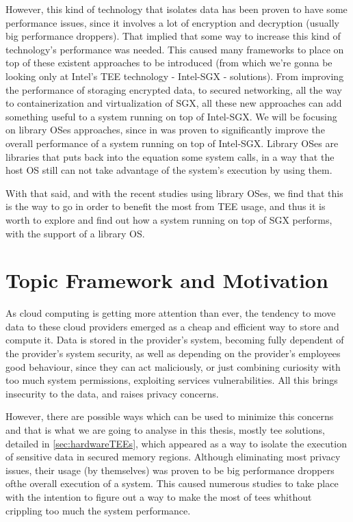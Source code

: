 However, this kind of technology that isolates data has been proven to have some performance issues, since it involves a lot of encryption and decryption (usually big performance droppers). That implied that some way to increase this kind of technology’s performance was needed. This caused many frameworks to place on top of these existent approaches to be introduced (from which we’re gonna be looking only at Intel’s TEE technology - Intel-SGX - solutions). 
From improving the performance of storaging encrypted data, to secured networking, all the way to containerization and virtualization of SGX, all these new approaches can add something useful to a system running on top of Intel-SGX. We will be focusing on library OSes approaches, since in \cite{graphenePaper} was proven to significantly improve the overall performance of a system running on top of Intel-SGX. Library OSes are libraries that puts back into the equation some system calls, in a way that the host OS still can not take advantage of the system’s execution by using them.
 
With that said, and with the recent studies using library OSes, we find that this is the way to go in order to benefit the most from TEE usage, and thus it is worth to explore and find out how a system running on top of SGX performs, with the support of a library OS.


\section{Topic Framework and Motivation} %
\label{sec:a_bit_of_history}

As cloud computing is getting more attention than ever, the tendency to move data to these cloud providers emerged as a cheap and efficient way to store and compute it. Data is stored in the provider's system, becoming fully dependent of the provider's system security, as well as depending on the provider's employees good behaviour, since they can act maliciously, or just combining curiosity with too much system permissions, exploiting services vulnerabilities. All this brings insecurity to the data, and raises privacy concerns.

However, there are possible ways which can be used to minimize this concerns and that is what we are going to analyse in this thesis, mostly  \gls{tee} solutions, detailed in \ref{sec:hardwareTEEs}, which appeared as a way to isolate the execution of sensitive data in secured memory regions. Although eliminating most privacy issues, their usage (by themselves) was proven to be big performance droppers ofthe overall execution of a system. This caused numerous studies to take place with the intention to figure out a way to make the most of \gls{tee}s whithout crippling too much the system performance. 

